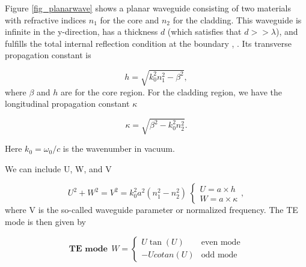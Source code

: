         Figure \ref{fig_planarwave} shows a planar waveguide consisting of two materials with refractive indices $n_1$ for the core and $n_2$ for the cladding. This waveguide is infinite in the y-direction, has a thickness $d$ (which satisfies that $d >> \lambda$), and fulfills the total internal reflection condition at the boundary \citep{yariv_b}, \citep{OKAMOTO200613}.  Its transverse propagation constant is
        
        
                    \begin{equation}
                        h=\sqrt{k_0^2n_1^2-\beta^2},
                        \label{eq_h}
                    \end{equation}
         where $\beta$ and $h$ are for the core region. For the cladding region, we have the longitudinal propagation constant $\kappa$
        
                     \begin{equation}
                        \kappa=\sqrt{\beta^2-k_0^2n_2^2}.
                        \label{gam}
                    \end{equation}
         
         Here $k_0 = \omega_0/c$ is the wavenumber in vacuum.
        
        
        
        We can include U, W, and V
        
                    \begin{equation}
                        U^2+W^2 = V^2 = k_0^2a^2(n_1^2-n_2^2) \
                        \begin{cases}
                            U = a \times h \\
                            W = a \times \kappa
                        \end{cases} 
                        \label{Normv},
                    \end{equation}
        where V is the so-called waveguide parameter or normalized frequency. 
        The TE mode is then given by 
                 
                    
                    \begin{equation}
                    \textbf{TE mode} \ \ W=
                        \begin{cases}
                            U \tan(U) & \text{even mode}\\
                            -U cotan(U) & \text{odd mode}
                        \end{cases}
                        \label{Temode}
                    \end{equation}
        
